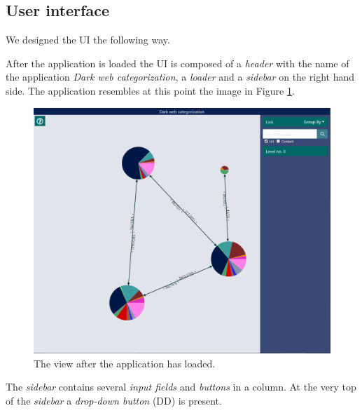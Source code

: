 \subsection{User interface}
We designed the UI the following way. 

After the application is loaded the UI is composed of a \textit{header} with the name of the application \textit{Dark web categorization}, a \textit{loader} and a \textit{sidebar} on the right hand side. The application resembles at this point the image in Figure \ref{zeroLevelGraphBasic}.
\begin{figure}[ht!]
  \centering
  \includegraphics[width=\textwidth]{Images/basic_view.png}
  \caption{The view after the application has loaded.}
  \label{zeroLevelGraphBasic}
\end{figure} 

The \textit{sidebar} contains several \textit{input fields} and \textit{buttons} in a column. At the very top of the \textit{sidebar} a \textit{drop-down button} (DD) is present. 

